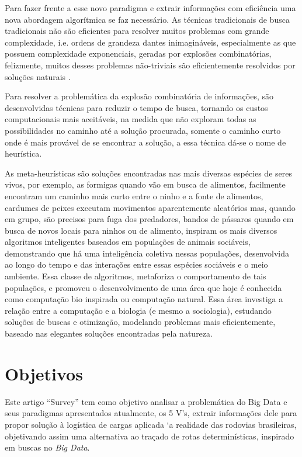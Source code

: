 \documentclass[conference,compsoc]{IEEEtran}
\begin{document}
Para fazer frente a esse novo paradigma e extrair informações com eficiência uma nova abordagem algorítmica se faz necessário. 
As técnicas tradicionais de busca tradicionais não são eficientes para resolver muitos problemas com grande complexidade, i.e. ordens de grandeza 
dantes inimagináveis, especialmente as que possuem complexidade exponenciais, geradas por explosões combinatórias, felizmente, 
muitos desses problemas não-triviais são eficientemente resolvidos por soluções naturais \cite{Swarm_Medeiros}.

Para resolver a problemática da explosão combinatória de informações, são desenvolvidas técnicas para reduzir o tempo de busca, 
tornando os custos computacionais mais aceitáveis, na medida que não exploram todas as possibilidades no caminho até a 
solução procurada, somente o caminho curto onde é mais provável de se encontrar a solução, a essa técnica dá-se o nome de heurística.

As meta-heurísticas são soluções encontradas nas mais diversas espécies de seres vivos, por exemplo, as formigas quando 
vão em busca de alimentos, facilmente encontram um caminho mais curto entre o ninho e a fonte de alimentos, cardumes de peixes 
executam movimentos aparentemente aleatórios mas, quando em grupo, são precisos para fuga dos predadores, bandos de pássaros 
quando em busca de novos locais para ninhos ou de alimento, inspiram os mais diversos algoritmos inteligentes baseados em 
populações de animais sociáveis, demonstrando que há uma inteligência coletiva nessas populações, desenvolvida ao longo do 
tempo e das interações entre essas espécies sociáveis e o meio ambiente. Essa classe de algoritmos, metaforiza o comportamento 
de tais populações, e promoveu o desenvolvimento de uma área que hoje é conhecida como computação bio inspirada ou computação 
natural. Essa área investiga a relação entre a computação e a biologia (e mesmo a sociologia), estudando soluções de buscas 
e otimização, modelando problemas mais eficientemente, baseado nas elegantes soluções encontradas pela natureza.


\section{Objetivos}

Este artigo ``Survey'' tem como objetivo analisar a problemática do Big Data e seus paradigmas apresentados atualmente, os 5 V's, extrair informações dele para propor solução à logística de cargas aplicada `a realidade das rodovias brasileiras, objetivando assim uma alternativa ao traçado de rotas determinísticas, inspirado em buscas no \textit{Big Data}. 
\end{document}
